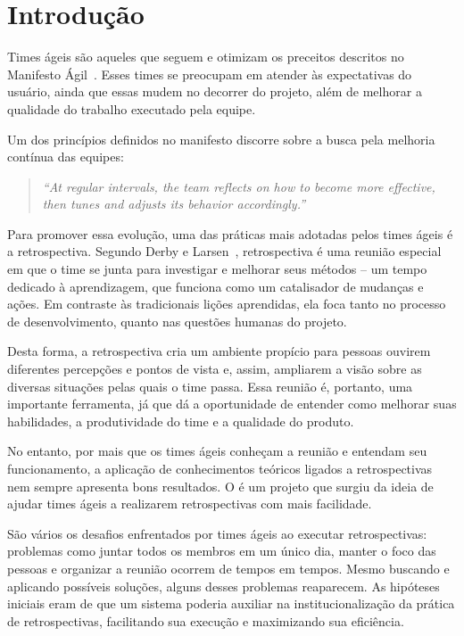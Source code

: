 \section{Introdução}
Times ágeis são aqueles que seguem e otimizam os preceitos descritos no Manifesto Ágil~\cite{manifesto}. Esses times se preocupam em atender às expectativas do usuário, ainda que essas mudem no decorrer do projeto, além de melhorar a qualidade do trabalho executado pela equipe.

Um dos princípios definidos no manifesto discorre sobre a busca pela melhoria contínua das equipes:

\begin{quote}
	\textit{``At regular intervals, the team reflects on how to become more effective, then tunes and adjusts its behavior accordingly.''}~\cite{manifesto}
\end{quote}

Para promover essa evolução, uma das práticas mais adotadas pelos times ágeis é a retrospectiva. Segundo Derby e Larsen~\cite{retrospectives}, retrospectiva é uma reunião especial em que o time se junta para investigar e melhorar seus métodos -- um tempo dedicado à aprendizagem, que funciona como um catalisador de mudanças e ações. Em contraste às tradicionais lições aprendidas, ela foca tanto no processo de desenvolvimento, quanto nas questões humanas do projeto.

Desta forma, a retrospectiva cria um ambiente propício para pessoas ouvirem diferentes percepções e pontos de vista e, assim, ampliarem a visão sobre as diversas situações pelas quais o time passa. Essa reunião é, portanto, uma importante ferramenta, já que dá a oportunidade de entender como melhorar suas habilidades, a produtividade do time e a qualidade do produto.

No entanto, por mais que os times ágeis conheçam a reunião e entendam seu funcionamento, a aplicação de conhecimentos teóricos ligados a retrospectivas nem sempre apresenta bons resultados. O \suricato{} é um projeto que surgiu da ideia de ajudar times ágeis a realizarem retrospectivas com mais facilidade.

São vários os desafios enfrentados por times ágeis ao executar retrospectivas: problemas como juntar todos os membros em um único dia, manter o foco das pessoas e organizar a reunião ocorrem de tempos em tempos. Mesmo buscando e aplicando possíveis soluções, alguns desses problemas reaparecem. As hipóteses iniciais eram de que um sistema poderia auxiliar na institucionalização da prática de retrospectivas, facilitando sua execução e maximizando sua eficiência.

